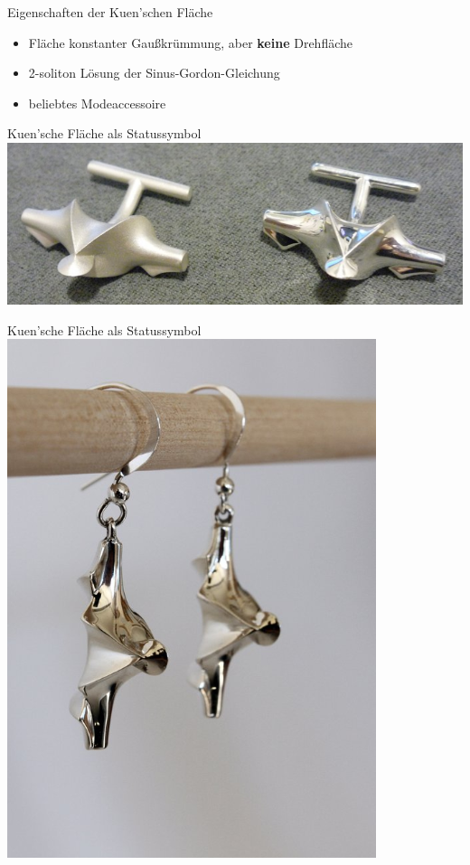 \documentclass[12pt]{beamer}
\begin{document}
\begin{frame}{Eigenschaften der Kuen'schen Fläche}
\begin{itemize}
\item Fläche konstanter Gaußkrümmung, aber \textbf{keine} Drehfläche \cite{wuensch}
\item 2-soliton Lösung der Sinus-Gordon-Gleichung \cite{bruter}
\item beliebtes Modeaccessoire
\end{itemize}
\end{frame}

\begin{frame}{Kuen'sche Fläche als Statussymbol}
\includegraphics[scale=0.5]{kuen_cuffs.png}
\end{frame}

\begin{frame}{Kuen'sche Fläche als Statussymbol}
\centering
\includegraphics[scale=0.5]{kuen_earrings.png}
\end{frame}
\end{document}
